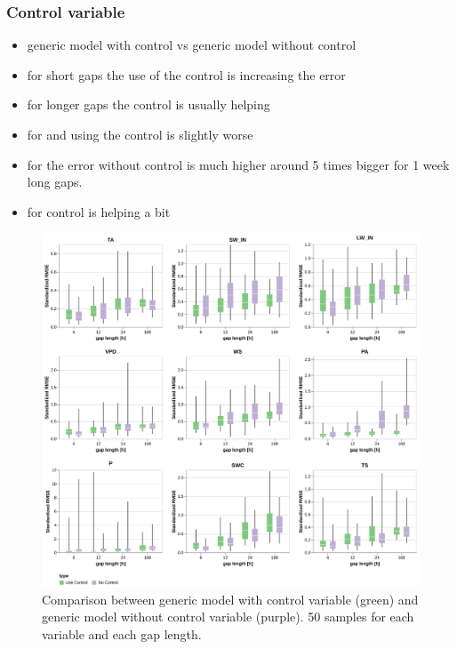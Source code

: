 \documentclass{article}
\newcommand{\imgwidth}{6in}
\begin{document}



\subsubsection{Control variable}

\begin{itemize}
    \item generic model with control vs generic model without control
    \item for short gaps the use of the control is increasing the error
    \item for longer gaps the control is usually helping
    \item for  and  using the control is slightly worse
    \item for  the error without control is much higher around 5 times bigger for 1 week long gaps.
    \item for  control is helping a bit
\end{itemize}



\begin{figure}
\centerline{\includegraphics[width=\imgwidth]{images/use_control.png}}
\caption{Comparison between generic model with control variable (green) and generic model without control variable (purple). 50 samples for each variable and each gap length.}
\label{fig:control}
\end{figure}
\end{document}
